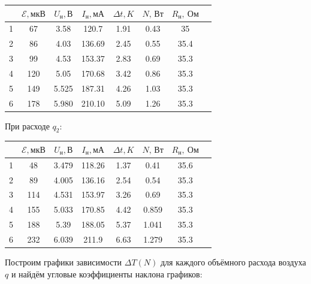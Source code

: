 \documentclass[a4paper, 12pt]{article}%
\begin{document}
\begin{center}
\begin{tabular}{|c|c|c|c|c|c|c|c|}\hline
{} &   $\mathcal{E}, \text{мкВ}$ & $U_\text{н}, \text{В}$ & $I_\text{н}, \text{мА}$ & $\Delta t, K$ & $N,\, \text{Вт}$ & $R_\text{н},\ \text{Ом}$ \\\hline
1 &   67 &  3.58 &  120.7 &  1.91 &   0.43 & 35 \\\hline
2 &   86 &  4.03 &  136.69 & 2.45 &   0.55 &  35.4 \\\hline
3 &  99 &  4.53 &  153.37 &  2.83 &  0.69 &  35.3 \\\hline
4 &  120 &  5.05 & 170.68 &  3.42 &  0.86 &  35.3 \\\hline
5 &  149 &  5.525 & 187.31 & 4.26 &  1.03 &  35.3 \\\hline
6 &  178 &  5.980 & 210.10 & 5.09 &  1.26 &  35.3 \\\hline
\end{tabular}
\end{center}
При расходе $q_2$:
\begin{center}

\begin{tabular}{|c|c|c|c|c|c|c|c|}\hline
{} &   $\mathcal{E}, \text{мкВ}$ & $U_\text{н}, \text{В}$ & $I_\text{н}, \text{мА}$ & $\Delta t, K$ & $N,\, \text{Вт}$ & $R_\text{н},\ \text{Ом}$ \\\hline
1 &   48 &  3.479 &   118.26 &  1.37 &  0.41 &  35.6 \\\hline
2 &   89 &  4.005 &  136.16 &  2.54 &  0.54 &  35.3 \\\hline
3 &  114 &  4.531 &  153.97 &  3.26 &  0.69 &  35.3 \\\hline
4 &  155 &  5.033 &  170.85 &  4.42 &  0.859 & 35.3 \\\hline
5 &  188 &  5.39 &   188.05 &  5.37 &  1.041 & 35.3 \\\hline
6 &  232 &  6.039 &  211.9 &   6.63 &  1.279 & 35.3 \\\hline
\end{tabular}

\end{center}
Построим графики зависимости $\Delta T(N)$ для каждого объёмного расхода воздуха $q$ и найдём угловые коэффициенты наклона графиков:
\end{document}
